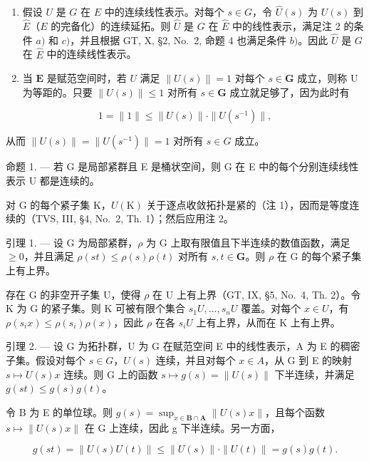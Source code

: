 \begin{enumerate}
\def\labelenumi{\arabic{enumi})}
\setcounter{enumi}{2}
\item
  假设 \(U\) 是 \(G\) 在 \(E\) 中的连续线性表示。对每个 \(s \in G\)，令 \(\widehat{U}(s)\) 为 \(U(s)\) 到 \(\widehat{E}\)（\(E\) 的完备化）的连续延拓。则 \(\widehat{U}\) 是 \(G\) 在 \(\widehat{E}\) 中的线性表示，满足注 2 的条件 \(a)\) 和 \(c)\)，并且根据 GT, X, §2, No.~2, 命题 4 也满足条件 \(b)\)。因此 \(\widehat{U}\) 是 \(G\) 在 \(\widehat{E}\) 中的连续线性表示。
\item
  当 \(\mathbf{E}\) 是赋范空间时，若 \(U\) 满足 \(\| U(s)\| = 1\) 对每个 \(s\in \mathbf{G}\) 成立，则称 U 为等距的。只要 \(\| U(s)\| \leqslant 1\) 对所有 \(s\in \mathbf{G}\) 成立就足够了，因为此时有
\end{enumerate}

\[
1 = \| 1 \| \leqslant \| U (s) \| \cdot \| U (s ^ {- 1}) \|,
\]

从而 \(\| U(s)\| = \| U(s^{-1})\| = 1\) 对所有 \(s\in G\) 成立。

命题 1. --- 若 G 是局部紧群且 E 是桶状空间，则 G 在 E 中的每个分别连续线性表示 U 都是连续的。

对 G 的每个紧子集 K，\(U(\mathrm{K})\) 关于逐点收敛拓扑是紧的（注 1），因而是等度连续的（TVS, III, §4, No.~2, Th. 1）；然后应用注 2。

引理 1. --- 设 G 为局部紧群，\(\rho\) 为 G 上取有限值且下半连续的数值函数，满足 \(\geqslant 0\)，并且满足 \(\rho(st) \leqslant \rho(s)\rho(t)\) 对所有 \(s, t \in \mathbf{G}\)。则 \(\rho\) 在 G 的每个紧子集上有上界。

存在 G 的非空开子集 U，使得 \(\rho\) 在 U 上有上界（GT, IX, §5, No.~4, Th. 2）。令 K 为 G 的紧子集。则 K 可被有限个集合 \(s_{1}U,\ldots,s_{n}U\) 覆盖。对每个 \(x\in U\)，有 \(\rho(s_{i}x)\leqslant\rho(s_{i})\rho(x)\)，因此 \(\rho\) 在各 \(s_{i}U\) 上有上界，从而在 K 上有上界。

引理 2. --- 设 G 为拓扑群，U 为 G 在赋范空间 E 中的线性表示，A 为 E 的稠密子集。假设对每个 \(s \in G\)，\(U(s)\) 连续，并且对每个 \(x \in A\)，从 G 到 E 的映射 \(s \mapsto U(s)x\) 连续。则 G 上的函数 \(s \mapsto g(s) = \|U(s)\|\) 下半连续，并满足 \(g(st) \leqslant g(s)g(t)\)。

令 B 为 E 的单位球。则 \(g(s) = \sup_{x \in \mathbf{B} \cap \mathbf{A}} \|U(s)x\|\)，且每个函数 \(s \mapsto \|U(s)x\|\) 在 G 上连续，因此 g 下半连续。另一方面，

\[
g (s t) = \| U (s) U (t) \| \leqslant \| U (s) \| \cdot \| U (t) \| = g (s) g (t).
\]


